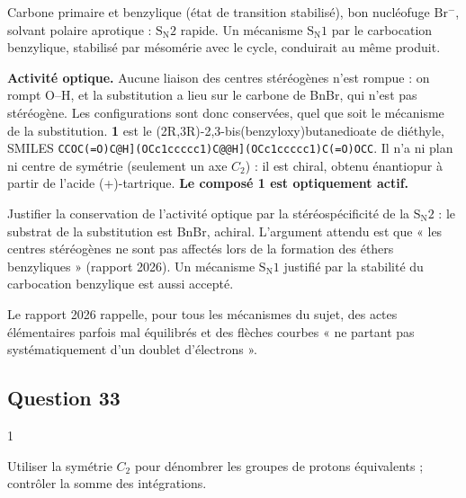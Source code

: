\documentclass[11pt,a4paper]{article}
\newcommand{\equationajustee}[1]{%
  \sbox{\boiteequation}{$\displaystyle #1$}%
  \ifdim\wd\boiteequation>\linewidth
    \[\resizebox{\linewidth}{!}{\usebox{\boiteequation}}\]%
  \else
    \[#1\]%
  \fi}
\begin{document}
\equationajustee{\mathrm{RO^-}+\mathrm{PhCH_2{-}Br}\longrightarrow\mathrm{RO{-}CH_2Ph}+\mathrm{Br^-}.}

Carbone primaire et benzylique (état de transition stabilisé), bon nucléofuge \(\mathrm{Br^-}\), solvant polaire aprotique : \(\mathrm{S_N2}\) rapide. Un mécanisme \(\mathrm{S_N1}\) par le carbocation benzylique, stabilisé par mésomérie avec le cycle, conduirait au même produit.

\textbf{Activité optique.} Aucune liaison des centres stéréogènes n'est rompue : on rompt O--H, et la substitution a lieu sur le carbone de BnBr, qui n'est pas stéréogène. Les configurations sont donc conservées, quel que soit le mécanisme de la substitution. \textbf{1} est le (2R,3R)-\allowbreak{}2,3-\allowbreak{}bis(benzyloxy)butanedioate de diéthyle, SMILES \texttt{CCOC(\allowbreak{}=\allowbreak{}O)\allowbreak{}{[}C@H{]}\allowbreak{}(\allowbreak{}OCc1ccccc1)\allowbreak{}{[}C@@H{]}\allowbreak{}(\allowbreak{}OCc1ccccc1)\allowbreak{}C(\allowbreak{}=\allowbreak{}O)\allowbreak{}OCC}. Il n'a ni plan ni centre de symétrie (seulement un axe \(C_2\)) : il est chiral, obtenu énantiopur à partir de l'acide (+)-tartrique. \textbf{Le composé 1 est optiquement actif.}

\begin{piege}

Justifier la conservation de l'activité optique par la stéréospécificité de la \(\mathrm{S_N2}\) : le substrat de la substitution est BnBr, achiral. L'argument attendu est que « les centres stéréogènes ne sont pas affectés lors de la formation des éthers benzyliques » (rapport 2026). Un mécanisme \(\mathrm{S_N1}\) justifié par la stabilité du carbocation benzylique est aussi accepté.

\end{piege}

\begin{jury}

Le rapport 2026 rappelle, pour tous les mécanismes du sujet, des actes élémentaires parfois mal équilibrés et des flèches courbes « ne partant pas systématiquement d'un doublet d'électrons ».

\end{jury}

\hypertarget{question-33}{%
\subsection{Question 33}\label{question-33}}

\begin{indication}{1}

Utiliser la symétrie \(C_2\) pour dénombrer les groupes de protons équivalents ; contrôler la somme des intégrations.

\end{indication}
\end{document}
